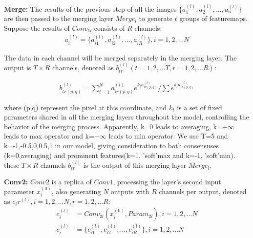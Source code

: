 \vspace{1mm}
\noindent
\textbf{Merge:} The results of the previous step of all the images $\{a_1^{(l)},a_2^{(l)},...,a_n^{(l)}\}$ are then passed to the merging layer $Merge_l$ to generate $t$ groups of featuremaps. Suppose the results of $Conv_{1l}$ consists of $R$ channels:
\begin{equation}\label{eq:5}
    \begin{split}
        a_i^{(l)} = \{a_{i1}^{(l)},a_{i2}^{(l)},...,a_{iR}^{(l)}\}, i=1,2,...N
\end{split}
\end{equation}

The data in each channel will be merged separately in the merging layer. The output is $T\times R$ channels, denoted as $b_{tr}^{(l)}(t=1,2,...T, r=1,2,...R)$:

\begin{equation}\label{eq:6}
    \begin{split}
        b_{tr(p,q)}^{(l)} = \sum_{i=1}^{N} a_{ir(p,q)}^{(l)} e^{k_t a_{ir(p,q)}^{(l)}} /\sum e^{k_t a_{ir(p,q)}^{(l)}}
\end{split}
\end{equation}

where (p,q) represent the pixel at this coordinate, and $k_t$ is a set of fixed parameters shared in all the merging layers throughout the model, controlling the behavior of the merging process. Apparently, k=0 leads to averaging, k=${+\infty}$ leads to max operator and k=${-\infty}$ leads to min operator. We use T=5 and k=-1,-0.5,0,0.5,1 in our model, giving consideration to both consensuses (k=0,averaging) and prominent features(k=1, 'soft'max and k=-1, 'soft'min). these $T\times R$ channels $b_{tr}^{(l)}$ is the output of this merging layer $Merge_l$.

\vspace{1mm}
\noindent
\textbf{Conv2:} $Conv2$ is a replica of $Conv1$, processing the layer's second input parameter $x_i^{(0)}$, also generating $N$ outputs with $R$ channels per output, denoted as $c_ir^{(l)}, i=1,2,...N, r=1,2,...R$:
\begin{equation}\label{eq:7}
    \begin{split}
        c_i^{(l)} &= Conv_{2l}(x_i^{(0)},Param_{2l}), i=1,2,...N\\
        c_i^{(l)} &= \{c_{i1}^{(l)},c_{i2}^{(l)},...,c_{iR}^{(l)}\}, i=1,2,...N\\
\end{split}
\end{equation}

